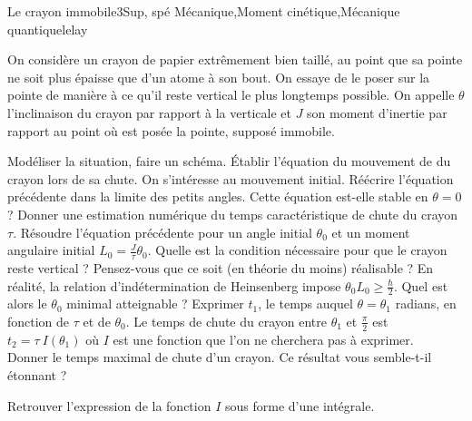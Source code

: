 
\begin{exercise}{Le crayon immobile}{3}{Sup, spé}
{Mécanique,Moment cinétique,Mécanique quantique}{lelay}

On considère un crayon de papier extrêmement bien taillé, au point que sa pointe ne soit plus épaisse que d'un atome à son bout. On essaye de le poser sur la pointe de manière à ce qu'il reste vertical le plus longtemps possible. 
On appelle $\theta$ l'inclinaison du crayon par rapport à la verticale et $J$ son moment d'inertie par rapport au point où est posée la pointe, supposé immobile.

\begin{questions}
    \question Modéliser la situation, faire un schéma.
    \question \'Etablir l'équation du mouvement de du crayon lors de sa chute.
    \question On s'intéresse au mouvement initial. Réécrire l'équation précédente dans la limite des petits angles. Cette équation est-elle stable en $\theta = 0$ ?
    \question Donner une estimation numérique du temps caractéristique de chute du crayon $\tau$.
    \question Résoudre l'équation précédente pour un angle initial $\theta_0$ et un moment angulaire initial $L_0 = \frac{J}{\tau} \theta_0$. Quelle est la condition nécessaire pour que le crayon reste vertical ? Pensez-vous que ce soit (en théorie du moins) réalisable ?
    \question En réalité, la relation d'indétermination de Heinsenberg impose $\theta_0 L_0 \geq \frac{\hbar}2$. Quel est alors le $\theta_0$ minimal atteignable ?
    \question Exprimer $t_1$, le temps auquel $\theta = \theta_1$ radians, en fonction de $\tau$ et de $\theta_0$. 
    \question Le temps de chute du crayon entre $\theta_1$ et $\frac\pi2$ est $t_2 = \tau \: I(\theta_1)$ où $I$ est une fonction que l'on ne cherchera pas à exprimer. \\
    Donner le temps maximal de chute d'un crayon. Ce résultat vous semble-t-il étonnant ?
\end{questions}

\plusloin
Retrouver l'expression de la fonction $I$ sous forme d'une intégrale.


\end{exercise}
